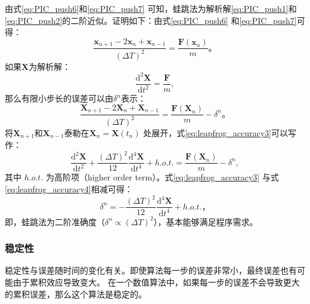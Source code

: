 {      由式\eqref{eq:PIC_push6}和\eqref{eq:PIC_push7} 可知，蛙跳法为解析解\eqref{eq:PIC_push1}和\eqref{eq:PIC_push2}的二阶近似。证明如下：由式\eqref{eq:PIC_push6} 和\eqref{eq:PIC_push7}可得：
      \begin{equation}
         \label{eq:leapfrog_accuracy}
         \frac{\mathbf{x}_{n+1}-2\mathbf{x}_{n}+\mathbf{x}_{n-1}}{(\Delta T)^2} = \frac{\mathbf{F}(\mathbf{x}_n)}{m} \text{。}
      \end{equation}
      如果$\mathbf{X}$为解析解：
      \begin{equation}
         \label{eq:leapfrog_accuracy2}
         \frac{\mathrm{d}^2 \mathbf{X}}{\mathrm{d} t^2} = \frac{\mathbf{F}}{m},
      \end{equation}
      那么有限小步长的误差可以由${\delta}^n$表示：
      \begin{equation}
         \label{eq:leapfrog_accuracy3}
         \frac{\mathbf{X}_{n+1}-2\mathbf{X}_{n}+\mathbf{X}_{n-1}}{(\Delta T)^2} = \frac{\mathbf{F}(\mathbf{X}_n)}{m} - {\delta}^n \text{。}
      \end{equation}
      将$\mathbf{X}_{n+1}$和$\mathbf{X}_{n-1}$泰勒在$\mathbf{X}_{n}=\mathbf{X}(t_n)$ 处展开，式\eqref{eq:leapfrog_accuracy3}可以写作：
      \begin{equation}
         \label{eq:leapfrog_accuracy4}
         \frac{\mathrm{d}^2 \mathbf{X}}{\mathrm{d} t^2} + \frac{(\Delta T)^2}{12} \frac{\mathrm{d}^4 \mathbf{X}}{\mathrm{d} t^4} + h.o.t. =  \frac{\mathbf{F}(\mathbf{X}_n)}{m} - {\delta}^n,
      \end{equation}
      其中 $h.o.t.$ 为高阶项（higher order term）。式\eqref{eq:leapfrog_accuracy3} 与式\eqref{eq:leapfrog_accuracy4}相减可得：
      \begin{equation}
         \label{eq:leapfrog_accuracy5}
         {\delta}^n = -\frac{(\Delta T)^2}{12} \frac{\mathrm{d}^4 \mathbf{X}}{\mathrm{d} t^4} + h.o.t. \text{，}
      \end{equation}
      即，蛙跳法为二阶准确度（${\delta}^n \propto (\Delta T)^2$），基本能够满足程序需求。
\subsubsection{稳定性}
稳定性与误差随时间的变化有关。即使算法每一步的误差非常小，最终误差也有可能由于累积效应导致变大。
在一个数值算法中，如果每一步的误差不会导致更大的累积误差，那么这个算法是稳定的。

}
